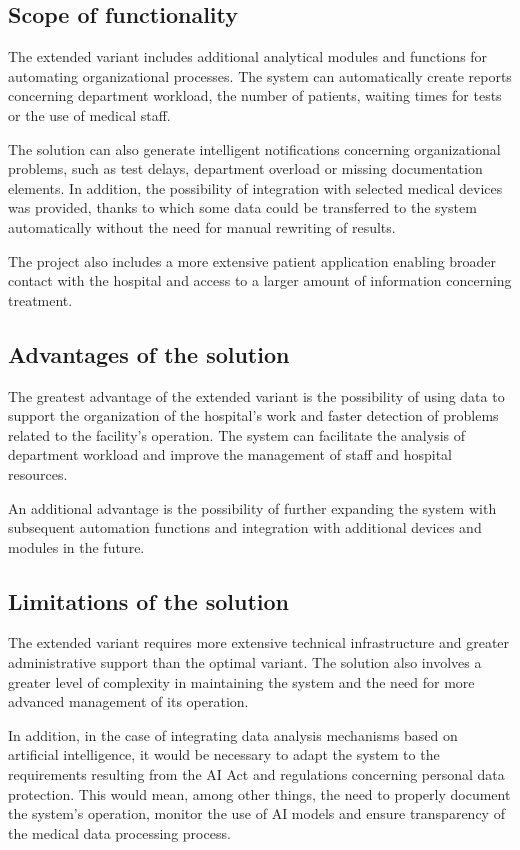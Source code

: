 \subsection{Scope of functionality}
The extended variant includes additional analytical modules and functions for automating organizational processes. The system can automatically create reports concerning department workload, the number of patients, waiting times for tests or the use of medical staff.

The solution can also generate intelligent notifications concerning organizational problems, such as test delays, department overload or missing documentation elements. In addition, the possibility of integration with selected medical devices was provided, thanks to which some data could be transferred to the system automatically without the need for manual rewriting of results.

The project also includes a more extensive patient application enabling broader contact with the hospital and access to a larger amount of information concerning treatment.
\subsection{Advantages of the solution}
The greatest advantage of the extended variant is the possibility of using data to support the organization of the hospital's work and faster detection of problems related to the facility's operation. The system can facilitate the analysis of department workload and improve the management of staff and hospital resources.

An additional advantage is the possibility of further expanding the system with subsequent automation functions and integration with additional devices and modules in the future.
\subsection{Limitations of the solution}
The extended variant requires more extensive technical infrastructure and greater administrative support than the optimal variant. The solution also involves a greater level of complexity in maintaining the system and the need for more advanced management of its operation.

In addition, in the case of integrating data analysis mechanisms based on artificial intelligence, it would be necessary to adapt the system to the requirements resulting from the AI Act and regulations concerning personal data protection. This would mean, among other things, the need to properly document the system's operation, monitor the use of AI models and ensure transparency of the medical data processing process.

